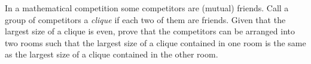 In a mathematical competition some competitors are (mutual) friends.
Call a group of competitors a \emph{clique} if each two of them are friends.
Given that the largest size of a clique is even,
prove that the competitors can be arranged into two rooms
such that the largest size of a clique contained in one room
is the same as the largest size of a clique contained in the other room.